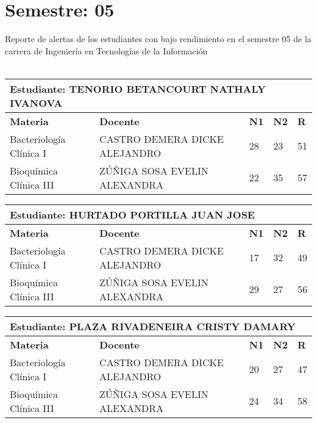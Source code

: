 \section{Semestre: 05}
        Reporte de alertas de los estudiantes con bajo rendimiento en el semestre 05 de la carrera de 
        Ingeniería en Tecnologías de la Información\\\\\small
\begin{tabularx}{\textwidth}{|p{5cm}|p{7cm}|X|X|X|}
\hline
\multicolumn{5}{|p{\dimexpr\textwidth-2\tabcolsep-2\arrayrulewidth}|}{\textbf{Estudiante: TENORIO BETANCOURT NATHALY IVANOVA }}\\\hline
\textbf{Materia} & \textbf{Docente} & \textbf{N1} & \textbf{N2} & \textbf{R} \\ \hline
Bacteriología Clínica I & CASTRO DEMERA DICKE ALEJANDRO  & 28 & 23& 51 \\ \hline
Bioquímica Clínica III & ZÚÑIGA SOSA EVELIN ALEXANDRA  & 22 & 35& 57 \\ \hline
\end{tabularx}\vspace{10mm}
\small
\begin{tabularx}{\textwidth}{|p{5cm}|p{7cm}|X|X|X|}
\hline
\multicolumn{5}{|p{\dimexpr\textwidth-2\tabcolsep-2\arrayrulewidth}|}{\textbf{Estudiante: HURTADO PORTILLA JUAN JOSE }}\\\hline
\textbf{Materia} & \textbf{Docente} & \textbf{N1} & \textbf{N2} & \textbf{R} \\ \hline
Bacteriología Clínica I & CASTRO DEMERA DICKE ALEJANDRO  & 17 & 32& 49 \\ \hline
Bioquímica Clínica III & ZÚÑIGA SOSA EVELIN ALEXANDRA  & 29 & 27& 56 \\ \hline
\end{tabularx}\vspace{10mm}
\small
\begin{tabularx}{\textwidth}{|p{5cm}|p{7cm}|X|X|X|}
\hline
\multicolumn{5}{|p{\dimexpr\textwidth-2\tabcolsep-2\arrayrulewidth}|}{\textbf{Estudiante: PLAZA RIVADENEIRA CRISTY DAMARY }}\\\hline
\textbf{Materia} & \textbf{Docente} & \textbf{N1} & \textbf{N2} & \textbf{R} \\ \hline
Bacteriología Clínica I & CASTRO DEMERA DICKE ALEJANDRO  & 20 & 27& 47 \\ \hline
Bioquímica Clínica III & ZÚÑIGA SOSA EVELIN ALEXANDRA  & 24 & 34& 58 \\ \hline
\end{tabularx}\vspace{10mm}
